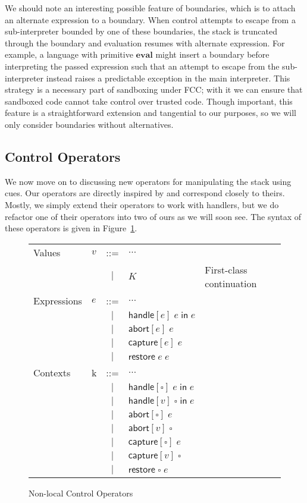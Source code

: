 \documentclass[11pt]{article}
\newcommand{\handle}[3]{\textsf{handle}[#1]\;#2\;\textsf{in}\;#3}
\newcommand{\abort}[2]{\textsf{abort}[#1]\;#2}
\newcommand{\capture}[2]{\textsf{capture}[#1]\;#2}
\newcommand{\pushSubcont}[2]{\textsf{restore}\;#1\;#2}
\begin{document}
We should note an interesting possible feature of boundaries, which is to attach an alternate expression to a boundary.
When control attempts to escape from a sub-interpreter bounded by one of these boundaries, the stack is truncated through the boundary and evaluation resumes with alternate expression.
For example, a language with primitive $\mathbf{eval}$ might insert a boundary before interpreting the passed expression such that an attempt to escape from the sub-interpreter instead raises a predictable exception in the main interpreter.
This strategy is a necessary part of sandboxing under FCC; with it we can ensure that sandboxed code cannot take control over trusted code.\cite{addDelimControlProduction}
Though important, this feature is a straightforward extension and tangential to our purposes, so we will only consider boundaries without alternatives.

\subsection{Control Operators}

We now move on to discussing new operators for manipulating the stack using cues.
Our operators are directly inspired by \cite{MFDC} and correspond closely to theirs.
Mostly, we simply extend their operators to work with handlers, but we do refactor one of their operators into two of ours as we will soon see.
The syntax of these operators is given in Figure~\ref{fig:addControl}.

\begin{figure}[h!]
\caption{Non-local Control Operators}
\label{fig:addControl}

\begin{tabular}{llcll}
Values & $v$ & ::= & $\ldots$ \\
& & $|$ & $K$ & First-class continuation \\
Expressions & $e$ & ::= & $\ldots$ \\
& & $|$ & $\handle{e}{e}{e}$ \\
& & $|$ & $\abort{e}{e}$ \\
& & $|$ & $\capture{e}{e}$ \\
& & $|$ & $\pushSubcont{e}{e}$ \\
Contexts & k & ::= & $\ldots$ \\
& & $|$ & $\handle{\square}{e}{e}$ \\
& & $|$ & $\handle{v}{\square}{e}$ \\
& & $|$ & $\abort{\square}{e}$ \\
& & $|$ & $\abort{v}{\square}$ \\
& & $|$ & $\capture{\square}{e}$ \\
& & $|$ & $\capture{v}{\square}$ \\
& & $|$ & $\pushSubcont{\square}{e}$ \\
\end{tabular}
\end{figure}
\end{document}
